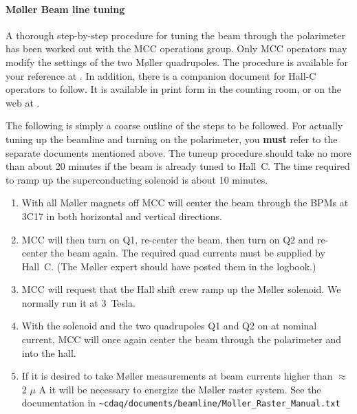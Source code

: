 {\paragraph{M\o ller Beam line tuning}

A thorough step-by-step procedure for tuning the beam through the
polarimeter has been worked out with the MCC operations group. Only
MCC operators may modify the settings of the two M\o ller quadrupoles.
The procedure is available for your reference at
. In addition, there is a companion 
document for Hall-C operators to follow. It is available in print form in
the counting room, or on the web at 
.

The following is simply a coarse outline of the steps to be followed.
For actually tuning up the beamline and turning on the polarimeter, you {\bf must}
refer to the separate documents mentioned above. The tuneup procedure should take no
more than about 20 minutes if the beam is already tuned to Hall~C.
The time required to ramp up the superconducting solenoid is about 10 minutes.
\begin{enumerate}
        \item With all M\o ller magnets off MCC will
           center  the beam through the BPMs at 3C17  in both
           horizontal  and vertical  directions. 

        \item MCC will then turn on Q1, re-center the beam, then turn
	on Q2 and re-center the beam again. The required quad currents
	must be supplied by Hall~C.  (The M\o ller expert should have
	posted them in the logbook.)

        \item MCC will request that the Hall shift crew ramp up the
	M\o ller solenoid. We normally run it at 3~Tesla.

        \item With the solenoid and the two quadrupoles Q1 and Q2 on
              at nominal current, MCC will once again center the beam
              through the polarimeter and into the hall.

	\item If it is desired to take M\o ller measurements at beam currents
	      higher than $\approx$ 2 $\mu$ A it will be necessary to energize
	      the M\o ller raster system. See the documentation in
              \nolinkurl{\~cdaq/documents/beamline/Moller\_Raster\_Manual.txt}
\end{enumerate}


}
